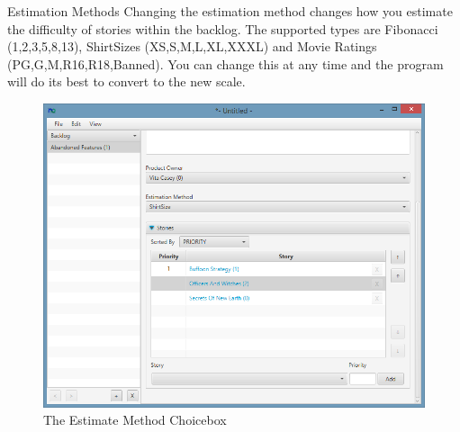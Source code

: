 \bigskip
Estimation Methods
\newline
Changing the estimation method changes how you estimate the difficulty of stories within the backlog. The supported types are Fibonacci (1,2,3,5,8,13), ShirtSizes (XS,S,M,L,XL,XXXL) and Movie Ratings (PG,G,M,R16,R18,Banned). You can change this at any time and the program will do its best to convert to the new scale.

\begin{figure}[H]
\centering
\includegraphics[width=\textwidth]{images/screenshots/backlogs.PNG}
\caption{The Estimate Method Choicebox}
\label{fig:new_project}
\end{figure}